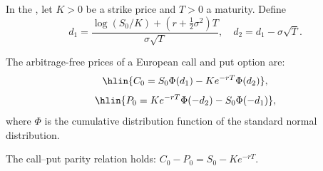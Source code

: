 \begin{theorem} \label{theorem:black_scholes_merton_formula_for_european_call_and_put_options}
In the , let $K > 0$ be a strike price and $T > 0$ a maturity. Define
$$d_1 = \frac{\log(S_0/K) + (r + \tfrac{1}{2}\sigma^2)T}{\sigma\sqrt{T}}, \quad d_2 = d_1 - \sigma\sqrt{T}.$$

The arbitrage-free prices of a European call and put option are:
$$\hlin{C_0 = S_0 \Phi(d_1) - K e^{-rT} \Phi(d_2)},$$
$$\hlin{P_0 = K e^{-rT} \Phi(-d_2) - S_0 \Phi(-d_1)},$$
where $\Phi$ is the cumulative distribution function of the standard normal distribution.

The call--put parity relation holds: $C_0 - P_0 = S_0 - K e^{-rT}$.
\end{theorem}
